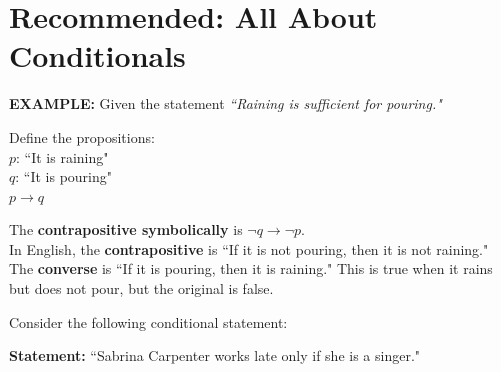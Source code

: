 \documentclass[homework, problems]{../../latex-common/cs151-common}
\begin{document}
\section{Recommended: All About Conditionals}
\begin{example}
\textbf{EXAMPLE:} Given the statement \textit{``Raining is sufficient for pouring."}

Define the propositions: \\
    $p$: ``It is raining" \\
    $q$: ``It is pouring" \\
    $p \rightarrow q$
    
The \textbf{contrapositive symbolically} is $\neg q \rightarrow \neg p$. \\
In English, the \textbf{contrapositive} is ``If it is not pouring, then it is not raining." \\
The \textbf{converse} is ``If it is pouring, then it is raining." This is true when it rains but does not pour, but the original is false.
\end{example}


Consider the following conditional statement:

\begin{center}
\textbf{Statement:} ``Sabrina Carpenter works late only if she is a singer."
\end{center}
\end{document}
